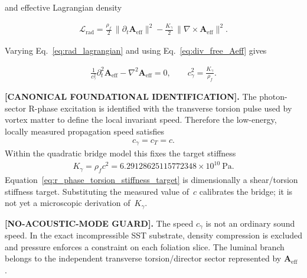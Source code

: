 \documentclass[11pt]{article}
\theoremstyle{definition}
\theoremstyle{plain}
\theoremstyle{remark}
\newcommand{\rhoF}{{\rho_{\!f}}}
\begin{document}
        and effective Lagrangian density

        \begin{align}
            \mathcal{L}_{\mathrm{rad}}
            =
            \frac{\rhoF}{2}\,\lVert \partial_t \mathbf{A}_{\mathrm{eff}}\rVert^2
            -
            \frac{K_\gamma}{2}\,\lVert \nabla\times\mathbf{A}_{\mathrm{eff}}\rVert^2.
            \label{eq:rad_lagrangian}
        \end{align}

        Varying Eq.~\eqref{eq:rad_lagrangian} and using Eq.~\eqref{eq:div_free_Aeff} gives

        \begin{align}
            \frac{1}{c_\gamma^2}\partial_t^2 \mathbf{A}_{\mathrm{eff}} - \nabla^2 \mathbf{A}_{\mathrm{eff}} = 0,
            \qquad
            c_\gamma^2 = \frac{K_\gamma}{\rhoF}.
            \label{eq:vector_wave_Aeff}
        \end{align}

        \textbf{[CANONICAL FOUNDATIONAL IDENTIFICATION].}
        The photon-sector R-phase excitation is identified with the transverse torsion pulse used by vortex matter to define the local invariant speed. Therefore the low-energy, locally measured propagation speed satisfies
        \begin{align}
            c_\gamma=c_T=c.
            \label{eq:r_phase_operational_light_speed}
        \end{align}
        Within the quadratic bridge model this fixes the target stiffness
        \begin{align}
            K_\gamma
            =
            \rhoF c^2
            =
            6.29128625115772348\times10^{10}\ \mathrm{Pa}.
            \label{eq:r_phase_torsion_stiffness_target}
        \end{align}
        Equation~\eqref{eq:r_phase_torsion_stiffness_target} is dimensionally a shear/torsion stiffness target. Substituting the measured value of~\(c\) calibrates the bridge; it is not yet a microscopic derivation of~\(K_\gamma\).

        \textbf{[NO-ACOUSTIC-MODE GUARD].}
        The speed \(c_\gamma\) is not an ordinary sound speed. In the exact incompressible SST substrate, density compression is excluded and pressure enforces a constraint on each foliation slice. The luminal branch belongs to the independent transverse torsion/director sector represented by \(\mathbf A_{\mathrm{eff}}\) \cite{BarceloLiberatiVisser2026}.
\end{document}
